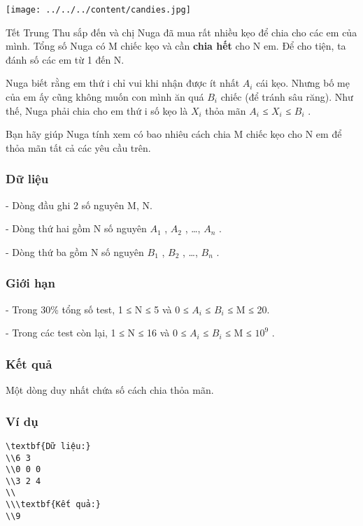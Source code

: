 








\texttt{[image: ../../../content/candies.jpg]}

   Tết Trung Thu sắp đến và chị Nuga đã mua rất nhiều kẹo để chia cho các em của mình. Tổng số Nuga có M chiếc kẹo và cần   \textbf{    chia hết   }   cho N em. Để cho tiện, ta đánh số các em từ 1 đến N.  

   Nuga biết rằng em thứ i chỉ vui khi nhận được ít nhất $A_{i}$   cái kẹo. Nhưng bố mẹ của em ấy cũng không muốn con mình ăn quá $B_{i}$   chiếc (để tránh sâu răng). Như thế, Nuga phải chia cho em thứ i số kẹo là $X_{i}$   thỏa mãn $A_{i}$   ≤ $X_{i}$   ≤ $B_{­i}$   .  

   Bạn hãy giúp Nuga tính xem có bao nhiêu cách chia M chiếc kẹo cho N em để thỏa mãn tất cả các yêu cầu trên.  

\subsubsection{   Dữ liệu  }

   - Dòng đầu ghi 2 số nguyên M, N.  

   - Dòng thứ hai gồm N số nguyên $A_{1}$   , $A_{2}$   , …, $A_{n}$   .  

   - Dòng thứ ba gồm N số nguyên $B_{1}$   , $B_{2}$   , …, $B_{n}$   .  

\subsubsection{\textbf{    Giới hạn   }}

   - Trong 30\% tổng số test, 1 ≤ N ≤ 5 và 0 ≤ $A_{i}$   ≤ $B_{i}$   ≤ M ≤ 20.  

   - Trong các test còn lại, 1 ≤ N ≤ 16 và 0 ≤ $A_{i}$   ≤ $B_{i}$   ≤ M ≤ $10^{9}$   .  

\subsubsection{   Kết quả  }

   Một dòng duy nhất chứa số cách chia thỏa mãn.  

\subsubsection{   Ví dụ  }
\begin{verbatim}
\textbf{Dữ liệu:}
\\6 3
\\0 0 0
\\3 2 4
\\
\\\textbf{Kết quả:}
\\9\end{verbatim}




